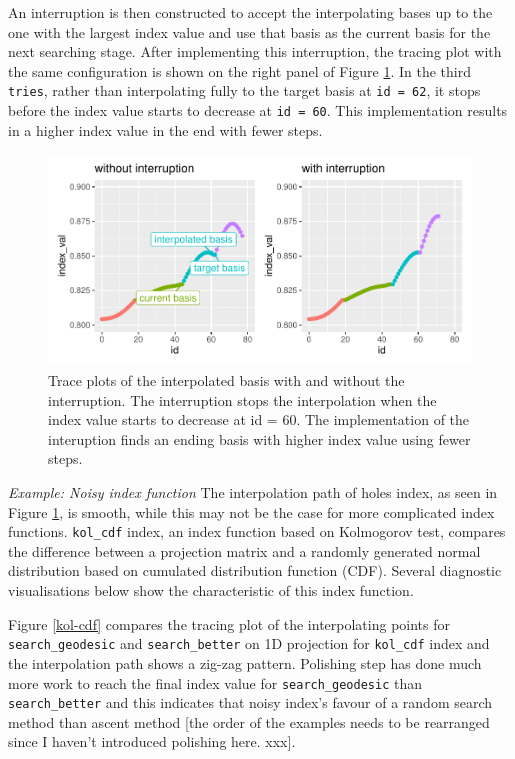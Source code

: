 \documentclass[12pt]{article}
\begin{document}
An interruption is then constructed to accept the interpolating bases up
to the one with the largest index value and use that basis as the
current basis for the next searching stage. After implementing this
interruption, the tracing plot with the same configuration is shown on
the right panel of Figure \ref{interruption}. In the third
\texttt{tries}, rather than interpolating fully to the target basis at
\texttt{id\ =\ 62}, it stops before the index value starts to decrease
at \texttt{id\ =\ 60}. This implementation results in a higher index
value in the end with fewer steps.

\begin{figure}
\centering
\includegraphics{paper_files/figure-latex/interruption-1.pdf}
\caption{\label{interruption}Trace plots of the interpolated basis with
and without the interruption. The interruption stops the interpolation
when the index value starts to decrease at id = 60. The implementation
of the interuption finds an ending basis with higher index value using
fewer steps.}
\end{figure}

\emph{Example: Noisy index function} The interpolation path of holes
index, as seen in Figure \ref{interruption}, is smooth, while this may
not be the case for more complicated index functions. \texttt{kol\_cdf}
index, an index function based on Kolmogorov test, compares the
difference between a projection matrix and a randomly generated normal
distribution based on cumulated distribution function (CDF). Several
diagnostic visualisations below show the characteristic of this index
function.

Figure \ref{kol-cdf} compares the tracing plot of the interpolating
points for \texttt{search\_geodesic} and \texttt{search\_better} on 1D
projection for \texttt{kol\_cdf} index and the interpolation path shows
a zig-zag pattern. Polishing step has done much more work to reach the
final index value for \texttt{search\_geodesic} than
\texttt{search\_better} and this indicates that noisy index's favour of
a random search method than ascent method {[}the order of the examples
needs to be rearranged since I haven't introduced polishing here.
xxx{]}.
\end{document}
